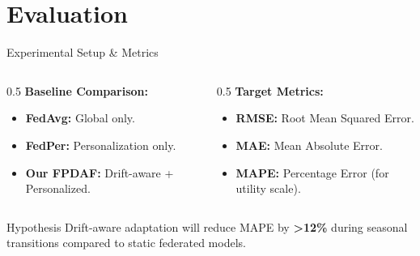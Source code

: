 \documentclass[aspectratio=169, 11pt]{beamer}
\begin{document}
\section{Evaluation}
\begin{frame}{Experimental Setup \& Metrics}
    \begin{columns}
        \begin{column}{0.5\textwidth}
            \textbf{Baseline Comparison:}
            \begin{itemize}
                \item \textbf{FedAvg:} Global only.
                \item \textbf{FedPer:} Personalization only.
                \item \textbf{Our FPDAF:} Drift-aware + Personalized.
            \end{itemize}
        \end{column}
        \begin{column}{0.5\textwidth}
            \textbf{Target Metrics:}
            \begin{itemize}
                \item \textbf{RMSE:} Root Mean Squared Error.
                \item \textbf{MAE:} Mean Absolute Error.
                \item \textbf{MAPE:} Percentage Error (for utility scale).
            \end{itemize}
        \end{column}
    \end{columns}
    \vspace{0.3cm}
    \begin{block}{Hypothesis}
        Drift-aware adaptation will reduce MAPE by \textbf{>12\%} during seasonal transitions compared to static federated models.
    \end{block}
\end{frame}
\end{document}
